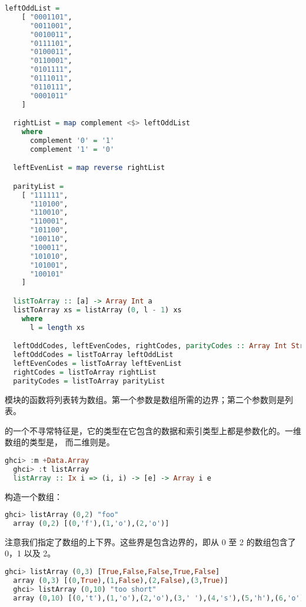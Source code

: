 \documentclass[./main.tex]{subfiles}
\begin{document}
\begin{lstlisting}[language=Haskell]
  leftOddList =
    [ "0001101",
      "0011001",
      "0010011",
      "0111101",
      "0100011",
      "0110001",
      "0101111",
      "0111011",
      "0110111",
      "0001011"
    ]

  rightList = map complement <$> leftOddList
    where
      complement '0' = '1'
      complement '1' = '0'

  leftEvenList = map reverse rightList

  parityList =
    [ "111111",
      "110100",
      "110010",
      "110001",
      "101100",
      "100110",
      "100011",
      "101010",
      "101001",
      "100101"
    ]

  listToArray :: [a] -> Array Int a
  listToArray xs = listArray (0, l - 1) xs
    where
      l = length xs

  leftOddCodes, leftEvenCodes, rightCodes, parityCodes :: Array Int String
  leftOddCodes = listToArray leftOddList
  leftEvenCodes = listToArray leftEvenList
  rightCodes = listToArray rightList
  parityCodes = listToArray parityList
\end{lstlisting}

模块的函数将列表转为数组。第一个参数是数组所需的边界；第二个参数则是列表。

的一个不寻常特征是，它的类型在它包含的数据和索引类型上都是参数化的。一维数组的类型是，
而二维则是。

\begin{lstlisting}[language=Haskell]
  ghci> :m +Data.Array
  ghci> :t listArray
  listArray :: Ix i => (i, i) -> [e] -> Array i e
\end{lstlisting}

构造一个数组：

\begin{lstlisting}[language=Haskell]
  ghci> listArray (0,2) "foo"
  array (0,2) [(0,'f'),(1,'o'),(2,'o')]
\end{lstlisting}

注意我们指定了数组的上下界。这些界是包含边界的，即从 0 至 2 的数组包含了 0，1 以及 2。

\begin{lstlisting}[language=Haskell]
  ghci> listArray (0,3) [True,False,False,True,False]
  array (0,3) [(0,True),(1,False),(2,False),(3,True)]
  ghci> listArray (0,10) "too short"
  array (0,10) [(0,'t'),(1,'o'),(2,'o'),(3,' '),(4,'s'),(5,'h'),(6,'o'),(7,'r'),(8,'t'),(9,*** Exception: (Array.!): undefined array element
\end{lstlisting}
\end{document}
